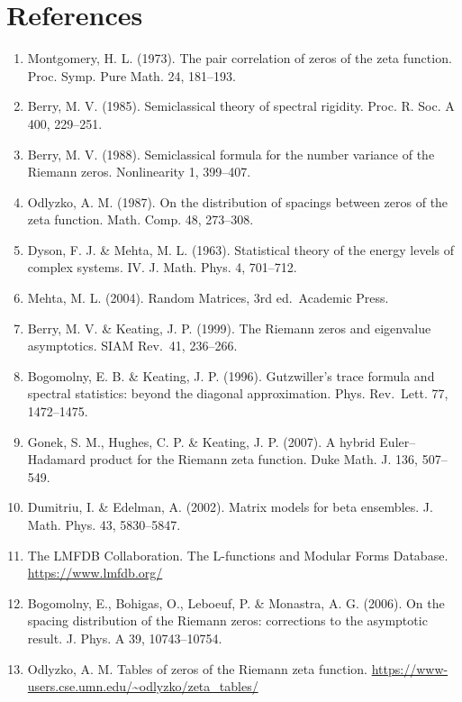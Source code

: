 \documentclass[11pt]{article}
\providecommand{\tightlist}{\setlength{\itemsep}{0pt}\setlength{\parskip}{0pt}}
\begin{document}
\hypertarget{references}{%
\section*{References}\label{references}}

\begin{enumerate}
\def\labelenumi{\arabic{enumi}.}
\tightlist
\item
  Montgomery, H. L. (1973). The pair correlation of zeros of the zeta
  function. Proc. Symp. Pure Math. 24, 181--193.
\item
  Berry, M. V. (1985). Semiclassical theory of spectral rigidity. Proc.
  R. Soc. A 400, 229--251.
\item
  Berry, M. V. (1988). Semiclassical formula for the number variance of
  the Riemann zeros. Nonlinearity 1, 399--407.
\item
  Odlyzko, A. M. (1987). On the distribution of spacings between zeros
  of the zeta function. Math. Comp. 48, 273--308.
\item
  Dyson, F. J. \& Mehta, M. L. (1963). Statistical theory of the energy
  levels of complex systems. IV. J. Math. Phys. 4, 701--712.
\item
  Mehta, M. L. (2004). Random Matrices, 3rd ed.~Academic Press.
\item
  Berry, M. V. \& Keating, J. P. (1999). The Riemann zeros and
  eigenvalue asymptotics. SIAM Rev.~41, 236--266.
\item
  Bogomolny, E. B. \& Keating, J. P. (1996). Gutzwiller's trace formula
  and spectral statistics: beyond the diagonal approximation. Phys.
  Rev.~Lett. 77, 1472--1475.
\item
  Gonek, S. M., Hughes, C. P. \& Keating, J. P. (2007). A hybrid
  Euler--Hadamard product for the Riemann zeta function. Duke Math. J.
  136, 507--549.
\item
  Dumitriu, I. \& Edelman, A. (2002). Matrix models for beta ensembles.
  J. Math. Phys. 43, 5830--5847.
\item
  The LMFDB Collaboration. The L-functions and Modular Forms Database.
  \url{https://www.lmfdb.org/}
\item
  Bogomolny, E., Bohigas, O., Leboeuf, P. \& Monastra, A. G. (2006). On
  the spacing distribution of the Riemann zeros: corrections to the
  asymptotic result. J. Phys. A 39, 10743--10754.
\item
  Odlyzko, A. M. Tables of zeros of the Riemann zeta function.
  \url{https://www-users.cse.umn.edu/~odlyzko/zeta_tables/}
\end{enumerate}
\end{document}
